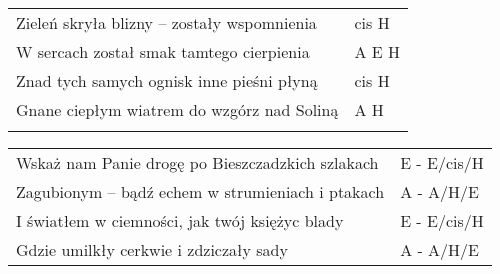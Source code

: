 \documentclass[a5paper]{article}
\begin{document}
\noindent
\begin{tabular}{@{}p{9.00cm}p{3cm}@{}}
Zieleń skryła blizny – zostały wspomnienia & cis H \\
W sercach  został smak tamtego cierpienia & A E H \\
Znad tych samych ognisk inne pieśni płyną & cis H \\
Gnane ciepłym wiatrem do wzgórz nad Soliną & A H \\ \\
\end{tabular}

\noindent
\begin{tabular}{@{}p{8.00cm}p{3cm}@{}}
Wskaż nam Panie drogę po Bieszczadzkich szlakach & E - E/cis/H \\
Zagubionym – bądź echem w strumieniach i ptakach & A - A/H/E \\
I światłem w ciemności, jak twój księżyc blady & E - E/cis/H \\
Gdzie umilkły cerkwie i zdziczały sady & A - A/H/E
\end{tabular}
\end{document}
